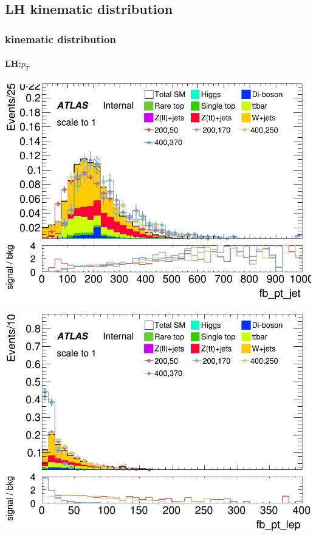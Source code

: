 \documentclass[usenames,dvipsnames]{beamer}
\begin{document}
\subsection{LH kinematic distribution}
\begin{frame}
	\frametitle{kinematic distribution}
	\framesubtitle{LH:$p_T$}
    \begin{minipage}{0.32\textwidth}
        \centering
        \includegraphics[width=\textwidth]{graphics/LH_met_sig/LH_fb_pt_jet_norm.png}
    \end{minipage}
    \hfill
    \begin{minipage}{0.32\textwidth}
        \centering
        \includegraphics[width=\textwidth]{graphics/LH_met_sig/LH_fb_pt_lep_norm.png}
    \end{minipage}

\end{frame}
\end{document}
